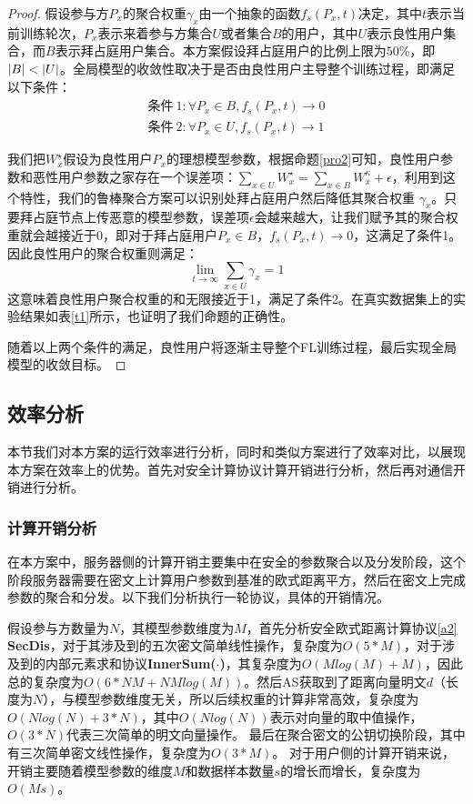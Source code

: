 \begin{proof}
	假设参与方$P_x$的聚合权重$\gamma_{x}$由一个抽象的函数$f_s(P_x,t)$决定，其中$t$表示当前训练轮次，$P_x$表示来着参与方集合$U$或者集合$B$的用户，其中$ U $表示良性用户集合，而$ B $表示拜占庭用户集合。本方案假设拜占庭用户的比例上限为$50\%$，即$\vert B\vert <\vert U\vert$。全局模型的收敛性取决于是否由良性用户主导整个训练过程，即满足以下条件：
	\begin{equation*}
		\begin{split}
			\mbox{条件}\ 1:{\forall}P_x \in B, f_s(P_x,t)\rightarrow 0 \\
			\mbox{条件}\ 2:{\forall}P_x \in U, f_s(P_x,t)\rightarrow 1
		\end{split}
	\end{equation*}
	
	我们把$W_x^{\star}$假设为良性用户$P_x$的理想模型参数，根据命题\ref{pro2}可知，良性用户参数和恶性用户参数之家存在一个误差项：$\sum_{x\in U}W_x^{\star}=   \sum_{x\in B}W_x^{\kappa} + \epsilon$，利用到这个特性，我们的鲁棒聚合方案可以识别处拜占庭用户然后降低其聚合权重 $\gamma_x$。只要拜占庭节点上传恶意的模型参数，误差项$\epsilon$会越来越大，让我们赋予其的聚合权重就会越接近于0，即对于拜占庭用户$P_x \in B$，$f_s(P_x, t)\rightarrow 0$，这满足了条件1。因此良性用户的聚合权重则满足：
	$$
		\lim_{t \to \infty}\sum_{x \in U} \gamma_x = 1
	$$
	这意味着良性用户聚合权重的和无限接近于1，满足了条件2。在真实数据集上的实验结果如表\ref{t1}所示，也证明了我们命题的正确性。
	
	随着以上两个条件的满足，良性用户将逐渐主导整个FL训练过程，最后实现全局模型的收敛目标。
\end{proof}

\subsection{效率分析}
本节我们对本方案的运行效率进行分析，同时和类似方案进行了效率对比，以展现本方案在效率上的优势。首先对安全计算协议计算开销进行分析，然后再对通信开销进行分析。

\subsubsection{计算开销分析}
在本方案中，服务器侧的计算开销主要集中在安全的参数聚合以及分发阶段，这个阶段服务器需要在密文上计算用户参数到基准的欧式距离平方，然后在密文上完成参数的聚合和分发。以下我们分析执行一轮协议，具体的开销情况。

假设参与方数量为$N$，其模型参数维度为$M$，首先分析安全欧式距离计算协议\ref{a2} \textbf{SecDis}，对于其涉及到的五次密文简单线性操作，复杂度为$O(5*M)$，对于涉及到的内部元素求和协议\textbf{InnerSum($\cdot$)}，其复杂度为$O(Mlog(M) + M)$，因此总的复杂度为$O(6*NM+NMlog(M))$。然后AS获取到了距离向量明文$d$（长度为$N$），与模型参数维度无关，所以后续权重的计算非常高效，复杂度为$O(Nlog(N) + 3*N)$，其中$O(Nlog(N))$表示对向量的取中值操作，$O(3*N)$代表三次简单的明文向量操作。
最后在聚合密文的公钥切换阶段，其中有三次简单密文线性操作，复杂度为$ O(3*M) $。
对于用户侧的计算开销来说，开销主要随着模型参数的维度$M$和数据样本数量$s$的增长而增长，复杂度为$O(Ms)$。


